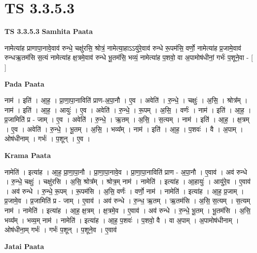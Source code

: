 \documentclass[17pt]{extarticle}
\begin{document}
\section{ TS 3.3.5.3 }

\textbf{TS 3.3.5.3 } \newline
\textbf{Samhita Paata} \newline

नामेत्या॑ह प्राणापा॒नावे॒वाव॑ रुन्धे॒ चक्षु॑रसि॒ श्रोत्रं॒ नामेत्या॒हाऽऽयु॑रे॒वाव॑ रुन्धे रू॒पम॑सि॒ वर्णो॒ नामेत्या॑ह प्र॒जामे॒वाव॑ रुन्धऋ॒तम॑सि स॒त्यं नामेत्या॑ह क्ष॒त्रमे॒वाव॑ रुन्धे भू॒तम॑सि॒ भव्यं॒ नामेत्या॑ह प॒शवो॒ वा अ॒पामोष॑धीनां॒ गर्भः॑ प॒शूने॒वा - [  ] \newline

\textbf{Pada Paata} \newline

नाम॑ । इति॑ । आ॒ह॒ । प्रा॒णा॒पा॒नाविति॑ प्राण-अ॒पा॒नौ । ए॒व । अवेति॑ । रु॒न्धे॒ । चक्षुः॑ । अ॒सि॒ । श्रोत्र᳚म् । नाम॑ । इति॑ । आ॒ह॒ । आयुः॑ । ए॒व । अवेति॑ । रु॒न्धे॒ । रू॒पम् । अ॒सि॒ । वर्णः॑ । नाम॑ । इति॑ । आ॒ह॒ । प्र॒जामिति॑ प्र - जाम् । ए॒व । अवेति॑ । रु॒न्धे॒ । ऋ॒तम् । अ॒सि॒ । स॒त्यम् । नाम॑ । इति॑ । आ॒ह॒ । क्ष॒त्रम् । ए॒व । अवेति॑ । रु॒न्धे॒ । भू॒तम् । अ॒सि॒ । भव्य᳚म् । नाम॑ । इति॑ । आ॒ह॒ । प॒शवः॑ । वै । अ॒पाम् । ओष॑धीनाम् । गर्भः॑ । प॒शून् । ए॒व ।  \newline


\textbf{Krama Paata} \newline

नामेति॑ । इत्या॑ह । आ॒ह॒ प्रा॒णा॒पा॒नौ । प्रा॒णा॒पा॒नावे॒व । प्रा॒णा॒पा॒नाविति॑ प्राण - अ॒पा॒नौ । ए॒वाव॑ । अव॑ रुन्धे । रु॒न्धे॒ चक्षुः॑ । चक्षु॑रसि । अ॒सि॒ श्रोत्र᳚म् । श्रोत्र॒म् नाम॑ । नामेति॑ । इत्या॑ह । आ॒हायुः॑ । आयु॑रे॒व । ए॒वाव॑ । अव॑ रुन्धे । रु॒न्धे॒ रू॒पम् । रू॒पम॑सि । अ॒सि॒ वर्णः॑ । वर्णो॒ नाम॑ । नामेति॑ । इत्या॑ह । आ॒ह॒ प्र॒जाम् । प्र॒जामे॒व । प्र॒जामिति॑ प्र - जाम् । ए॒वाव॑ । अव॑ रुन्धे । रु॒न्ध॒ ऋ॒तम् । ऋ॒तम॑सि । अ॒सि॒ स॒त्यम् । स॒त्यम् नाम॑ । नामेति॑ । इत्या॑ह । आ॒ह॒ क्ष॒त्रम् । क्ष॒त्रमे॒व । ए॒वाव॑ । अव॑ रुन्धे । रु॒न्धे॒ भू॒तम् । भू॒तम॑सि । अ॒सि॒ भव्य᳚म् । भव्य॒म् नाम॑ । नामेति॑ । इत्या॑ह । आ॒ह॒ प॒शवः॑ । प॒शवो॒ वै । वा अ॒पाम् । अ॒पामोष॑धीनाम् । ओष॑धीना॒म् गर्भः॑ । गर्भः॑ प॒शून् । प॒शूने॒व । ए॒वाव॑ \newline

\textbf{Jatai Paata} \newline
\end{document}
